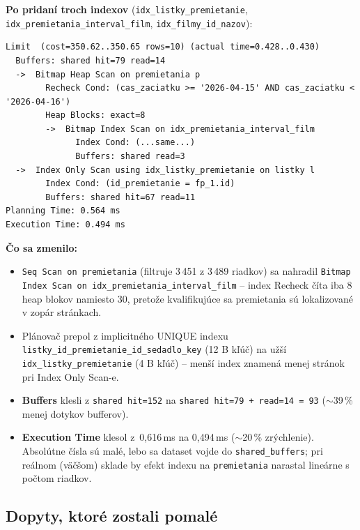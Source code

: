 \documentclass[11pt, a4paper]{article}
\begin{document}
\textbf{Po pridaní troch indexov} (\texttt{idx\_listky\_premietanie},
\texttt{idx\_premietania\_interval\_film}, \texttt{idx\_filmy\_id\_nazov}):
\begin{lstlisting}[caption={Plán po vytvorení indexov -- skrátené, kľúčové uzly}]
Limit  (cost=350.62..350.65 rows=10) (actual time=0.428..0.430)
  Buffers: shared hit=79 read=14
  ->  Bitmap Heap Scan on premietania p
        Recheck Cond: (cas_zaciatku >= '2026-04-15' AND cas_zaciatku < '2026-04-16')
        Heap Blocks: exact=8
        ->  Bitmap Index Scan on idx_premietania_interval_film
              Index Cond: (...same...)
              Buffers: shared read=3
  ->  Index Only Scan using idx_listky_premietanie on listky l
        Index Cond: (id_premietanie = fp_1.id)
        Buffers: shared hit=67 read=11
Planning Time: 0.564 ms
Execution Time: 0.494 ms
\end{lstlisting}

\textbf{Čo sa zmenilo:}

\begin{itemize}
    \item \texttt{Seq Scan on premietania} (filtruje 3\,451 z 3\,489
    riadkov) sa nahradil \texttt{Bitmap Index Scan on
    idx\_premietania\_interval\_film} -- index Recheck číta iba 8 heap
    blokov namiesto 30, pretože kvalifikujúce sa premietania sú
    lokalizované v zopár stránkach.

    \item Plánovač prepol z implicitného UNIQUE indexu
    \texttt{listky\_id\_premietanie\_id\_sedadlo\_key} (12 B kľúč) na
    užší \texttt{idx\_listky\_premietanie} (4 B kľúč) -- menší index
    znamená menej stránok pri Index Only Scan-e.

    \item \textbf{Buffers} klesli z \texttt{shared hit=152} na
    \texttt{shared hit=79 + read=14 = 93} ($\sim$39\,\% menej dotykov
    bufferov).

    \item \textbf{Execution Time} klesol z \,0,616\,ms na 0,494\,ms
    ($\sim$20\,\% zrýchlenie). Absolútne čísla sú malé, lebo sa dataset
    vojde do \texttt{shared\_buffers}; pri reálnom (väčšom) sklade
    by efekt indexu na \texttt{premietania} narastal lineárne s počtom
    riadkov.
\end{itemize}

\subsection{Dopyty, ktoré zostali pomalé}
\end{document}
